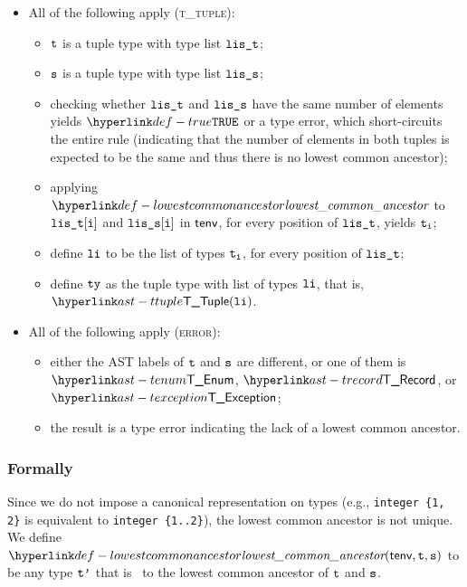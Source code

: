 \begin{itemize}
\begin{itemize}
    \item All of the following apply (\textsc{t\_tuple}):
    \begin{itemize}
      \item $\vt$ is a tuple type with type list $\vlit$;
      \item $\vs$ is a tuple type with type list $\vlis$;
      \item checking whether $\vlit$ and $\vlis$ have the same number of elements yields $\True$
            or a type error, which short-circuits the entire rule (indicating that the number of elements in both tuples is expected
            to be the same and thus there is no lowest common ancestor);
      \item applying $\lca$ to $\vlit[\vi]$ and $\vlis[\vi]$ in $\tenv$, for every position of $\vlit$,
            yields $\vt_\vi$\ProseOrTypeError;
      \item define $\vli$ to be the list of types $\vt_\vi$, for every position of $\vlit$;
      \item define $\tty$ as the tuple type with list of types $\vli$, that is, $\TTuple(\vli)$.
    \end{itemize}

    \item All of the following apply (\textsc{error}):
    \begin{itemize}
      \item either the AST labels of $\vt$ and $\vs$ are different, or one of them is $\TEnum$, $\TRecord$, or $\TException$;
      \item the result is a type error indicating the lack of a lowest common ancestor.
    \end{itemize}
  \end{itemize}
\end{itemize}

\subsubsection{Formally}
Since we do not impose a canonical representation on types (e.g., \verb|integer {1, 2}| is equivalent to \verb|integer {1..2}|),
the lowest common ancestor is not unique.
We define $\lca(\tenv, \vt, \vs)$ to be any type $\vtp$ that is \typeequivalent\ to the lowest common ancestor of $\vt$ and $\vs$.

\begin{mathpar}
\end{mathpar}


